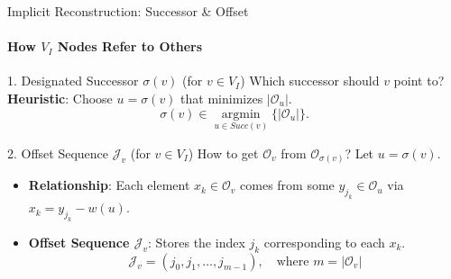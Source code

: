 \begin{frame}{Implicit Reconstruction: Successor \& Offset}
    \framesubtitle{How $V_I$ Nodes Refer to Others}

    \begin{block}{1. Designated Successor $\sigma(v)$ (for $v \in V_I$)}
        Which successor should $v$ point to?
        \textbf{Heuristic}: Choose $u = \sigma(v)$ that minimizes $|\mathcal{O}_u|$.
        \[ \sigma(v) \in \underset{u \in Succ(v)}{\operatorname{argmin}} \{ |\mathcal{O}_u| \}. \]
    \end{block}
    \begin{block}{2. Offset Sequence $\mathcal{J}_v$ (for $v \in V_I$)}
        How to get $\mathcal{O}_v$ from $\mathcal{O}_{\sigma(v)}$? Let $u=\sigma(v)$.
        \begin{itemize}
            \item \textbf{Relationship}: Each element $x_k \in \mathcal{O}_v$ comes from some $y_{j_k} \in \mathcal{O}_u$ via $x_k = y_{j_k} - w(u)$.
            \item \textbf{Offset Sequence $\mathcal{J}_v$}: Stores the index $j_k$ corresponding to each $x_k$.
                  \[ \mathcal{J}_v = (j_0, j_1, \dots, j_{m-1}), \quad \text{where } m = |\mathcal{O}_v| \]
        \end{itemize}
    \end{block}

\end{frame}


